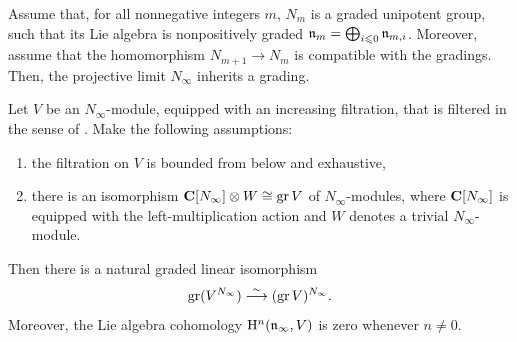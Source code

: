 
\begin{proposition} \label{proposition:gr-invariant-pro}
	Assume that, for all nonnegative integers $m$, $N_m$ is a graded unipotent group, such that its Lie algebra is nonpositively graded $\mathfrak n_m = \bigoplus_{i \leqslant 0} \mathfrak n_{m,i}$. Moreover, assume that the homomorphism $N_{m+1} \rightarrow N_m$ is compatible with the gradings. Then, the projective limit $N_\infty$ inherits a grading.
	
	Let $V$ be an $N_\infty$-module, equipped with an increasing filtration, that is filtered in the sense of . Make the following assumptions:
	\begin{enumerate}
		\item the filtration on $V$ is bounded from below and exhaustive,

		
		\item there is an isomorphism $\mathbf{C}[N_\infty] \otimes W \cong \operatorname{gr} V$ of $N_\infty$-modules, where $\mathbf{C}[N_\infty]$ is equipped with the left-multiplication action and $W$ denotes a trivial $N_\infty$-module.
	\end{enumerate}
	Then there is a natural graded linear isomorphism 
	$$ \operatorname{gr} (V^{N_\infty}) \overset{\sim}{\longrightarrow} (\operatorname{gr} V)^{N_\infty}. $$
	Moreover, the Lie algebra cohomology $\mathrm{H}^n(\mathfrak n_\infty, V)$ is zero whenever $n \neq 0$. 
\end{proposition}

